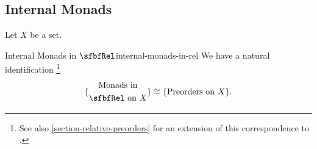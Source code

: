 \subsection{Internal Monads}\label{subsection-internal-monads-in-rel}
Let $X$ be a set.
\begin{proposition}{Internal Monads in $\sfbfRel$}{internal-monads-in-rel}%
    We have a natural identification%
    \footnote{%
        See also \cref{section-relative-preorders} for an extension of this correspondence to .
        \par\vspace*{\TCBBoxCorrection}
    }%
    \[
        \{
            \begin{gathered}
                \text{Monads in}\\
                \text{$\sfbfRel$ on $X$}
            \end{gathered}
        \}
        \cong
        \{\text{Preorders on $X$}\}.
    \]%
\end{proposition}

